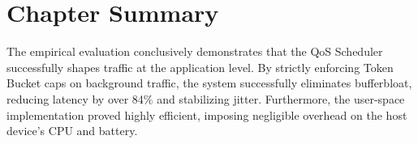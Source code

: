 \section{Chapter Summary}
\label{sec:ch8_summary}

The empirical evaluation conclusively demonstrates that the QoS Scheduler successfully shapes traffic at the application level. By strictly enforcing Token Bucket caps on background traffic, the system successfully eliminates bufferbloat, reducing latency by over 84\% and stabilizing jitter. Furthermore, the user-space implementation proved highly efficient, imposing negligible overhead on the host device's CPU and battery.
